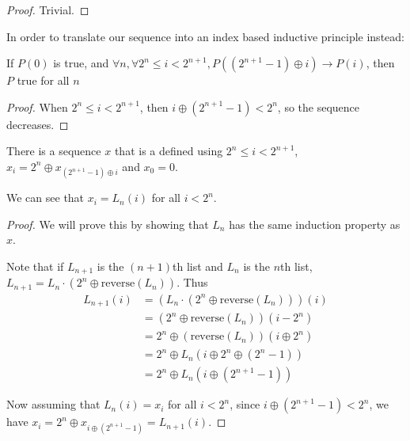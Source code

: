 \begin{proof}
    \leanok
    Trivial.
\end{proof}

\begin{theorem}
    \label{thm:recursion_principle}
    \leanok

    In order to translate our sequence into an index based inductive principle instead:
    
    If $P(0)$ is true, and $\forall n, \forall 2^n \le i < 2^{n+1}, P((2^{n+1} - 1) \oplus i) \to P(i)$, then
    $P$ true for all $n$
\end{theorem}

\begin{proof}
    \leanok
    When $2^n \le i < 2^{n+1}$, then $i \oplus (2^{n+1} - 1) < 2^n$, so
    the sequence decreases.
\end{proof}

\begin{definition}
    \label{def:recursive_gray_code}
    \leanok

    There is a sequence $x$ that is a defined using $2^n \le i < 2^{n+1}$, $x_i = 2^n \oplus x_{(2^{n+1} - 1) \oplus i}$
    and $x_0 = 0$.
\end{definition}

\begin{theorem}
    \label{thm:list_is_recursive}
    \leanok

    We can see that $x_i = L_n(i)$ for all $i < 2^n$. 
\end{theorem}

\begin{proof}
    \leanok
    We will prove this by showing that $L_n$ has the same induction property as $x$.

    Note that if $L_{n+1}$ is the $(n+1)$th list and $L_n$ is the $n$th list, $L_{n+1} = L_n \cdot (2^n \oplus \mathrm{reverse}(L_n))$. Thus
    \begin{align*}
    L_{n+1}(i) &= (L_n \cdot (2^n \oplus \mathrm{reverse}(L_n)))(i) \\
        &= (2^n \oplus \mathrm{reverse}(L_n))(i - 2^n) \\
        &= 2^n \oplus (\mathrm{reverse}(L_n))(i \oplus 2^n) \\
        &= 2^n \oplus L_n(i \oplus 2^n \oplus (2^n - 1)) \\
        &= 2^n \oplus L_n({i \oplus (2^{n+1} - 1)})
    \end{align*}

    Now assuming that $L_n(i) = x_i$ for all $i < 2^n$, since $i \oplus (2^{n+1} - 1) < 2^n$, we have
    $x_i = 2^n \oplus x_{i \oplus (2^{n+1} - 1)} = L_{n+1}(i)$.
\end{proof}

